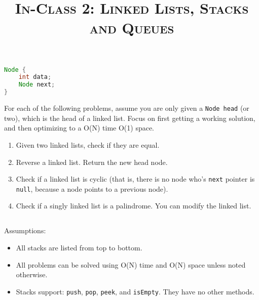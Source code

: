 \documentclass{article}
\title{\large{\textsc{In-Class 2: Linked Lists, Stacks and Queues}}}
\date{}
\begin{document}
\maketitle


\begin{lstlisting}[language=Java]
Node {
    int data;
    Node next;
}

\end{lstlisting}

\noindent For each of the following problems, assume you are only given a \texttt{Node head} (or two), which is the head of a linked list. Focus on first getting a working solution, and then optimizing to a O(N) time O(1) space.

\begin{enumerate}

\setcounter{enumi}{0}

\item Given two linked lists, check if they are equal.
    
\item Reverse a linked list. Return the new head node.

\item Check if a linked list is cyclic (that is, there is no node who's \texttt{next} pointer is \texttt{null}, because a node points to a previous node).

\item Check if a singly linked list is a palindrome. You can modify the linked list.
 
\end{enumerate}

\subsection*{}

Assumptions:

\begin{itemize}
  \item All stacks are listed from top to bottom.
  \item All problems can be solved using O(N) time and O(N) space unless noted otherwise.
  \item Stacks support: \texttt{push}, \texttt{pop}, \texttt{peek}, and \texttt{isEmpty}. They have no other methods.
\end{itemize}
    
\subsection*{}
\end{document}
